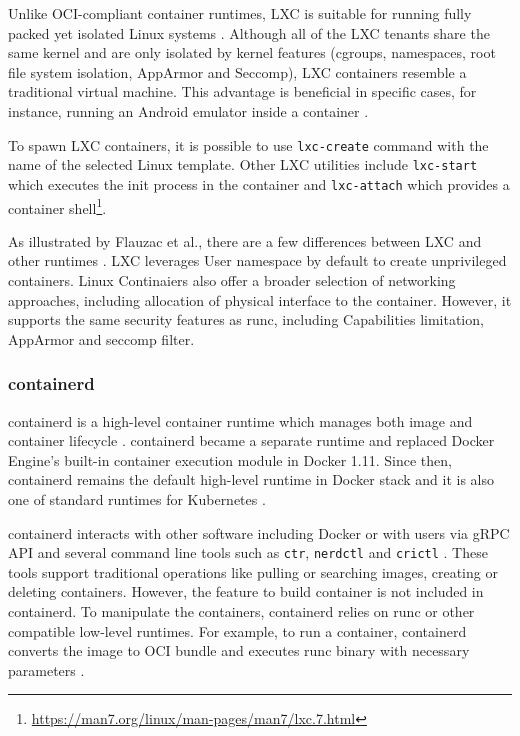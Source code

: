Unlike OCI-compliant container runtimes, LXC is suitable for running fully packed yet isolated Linux systems \cite{b:lxc}. Although all of the LXC tenants share the same kernel and are only isolated by kernel features (cgroups, namespaces, root file system isolation, AppArmor and Seccomp), LXC containers resemble a traditional virtual machine. This advantage is beneficial in specific cases, for instance, running an Android emulator inside a container \cite{c:8}.

To spawn LXC containers, it is possible to use \texttt{lxc-create} command with the name of the selected Linux template. Other LXC utilities include \texttt{lxc-start} which executes the init process in the container and \texttt{lxc-attach} which provides a container shell\footnote{\url{https://man7.org/linux/man-pages/man7/lxc.7.html}}.

As illustrated by Flauzac et al., there are a few differences between LXC and other runtimes \cite{pcs:1}. LXC leverages User namespace by default to create unprivileged containers. Linux Continaiers also offer a broader selection of networking approaches, including allocation of physical interface to the container. However, it supports the same security features as runc, including Capabilities limitation, AppArmor and seccomp filter.

\subsubsection*{containerd}

containerd is a high-level container runtime which manages both image and container lifecycle \cite{b:ianlewis3}. containerd became a separate runtime and replaced Docker Engine's built-in container execution module in Docker 1.11. Since then, containerd remains the default high-level runtime in Docker stack and it is also one of standard runtimes for Kubernetes \cite{book:kube}.

containerd interacts with other software including Docker or with users via gRPC API and several command line tools such as \texttt{ctr}, \texttt{nerdctl} and \texttt{crictl} \cite{d:getting-started}. These tools support traditional operations like pulling or searching images, creating or deleting containers. However, the feature to build container is not included in containerd. To manipulate the containers, containerd relies on runc or other compatible low-level runtimes. For example, to run a container, containerd converts the image to OCI bundle and executes runc binary with necessary parameters \cite{c:4}.

